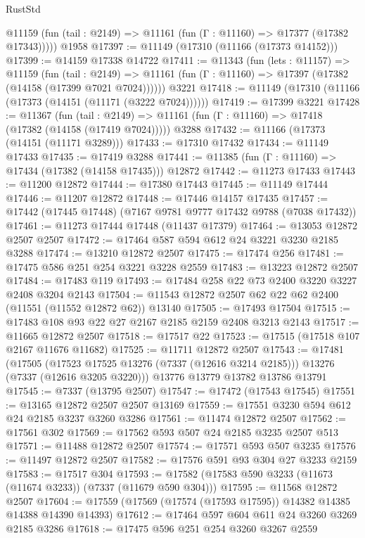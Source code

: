 \begin{lexlean}{RustStd}
\begin{coremodule}
      @11159 (fun (tail : @2149) => @11161 (fun (Γ : @11160) => @17377 (@17382 @17343)))))
    @1958
@17397 := @11149 (@17310 (@11166 (@17373 @14152)))
@17399 := @14159 @17338 @14722
@17411 := @11343
    (fun (lets : @11157) =>
    @11159
      (fun (tail : @2149) =>
      @11161 (fun (Γ : @11160) => @17397 (@17382 (@14158 (@17399 @7021 @7024))))))
    @3221
@17418 := @11149 (@17310 (@11166 (@17373 (@14151 (@11171 (@3222 @7024))))))
@17419 := @17399 @3221
@17428 := @11367
    (fun (tail : @2149) => @11161 (fun (Γ : @11160) => @17418 (@17382 (@14158 (@17419 @7024)))))
    @3288
@17432 := @11166 (@17373 (@14151 (@11171 @3289)))
@17433 := @17310 @17432
@17434 := @11149 @17433
@17435 := @17419 @3288
@17441 := @11385 (fun (Γ : @11160) => @17434 (@17382 (@14158 @17435))) @12872
@17442 := @11273 @17433
@17443 := @11200 @12872
@17444 := @17380 @17443
@17445 := @11149 @17444
@17446 := @11207 @12872
@17448 := @17446 @14157 @17435
@17457 := @17442 (@17445 @17448) (@7167 @9781 @9777 @17432 @9788 (@7038 @17432))
@17461 := @11273 @17444 @17448 (@11437 @17379)
@17464 := @13053 @12872 @2507 @2507
@17472 := @17464 @587 @594 @612 @24 @3221 @3230 @2185 @3288
@17474 := @13210 @12872 @2507
@17475 := @17474 @256
@17481 := @17475 @586 @251 @254 @3221 @3228 @2559
@17483 := @13223 @12872 @2507
@17484 := @17483 @119
@17493 := @17484 @258 @22 @73 @2400 @3220 @3227 @2408 @3204 @2143
@17504 := @11543 @12872 @2507 @62 @22 @62 @2400 (@11551 (@11552 @12872 @62)) @13140
@17505 := @17493 @17504
@17515 := @17483 @108 @93 @22 @27 @2167 @2185 @2159 @2408 @3213 @2143
@17517 := @11665 @12872 @2507
@17518 := @17517 @22
@17523 := @17515 (@17518 @107 @2167 @11676 @11682)
@17525 := @11711 @12872 @2507
@17543 := @17481
    (@17505 (@17523 @17525 @13276 (@7337 (@12616 @3214 @2185))) @13276 (@7337 (@12616 @3205 @3220)))
    @13776
    @13779
    @13782
    @13786
    @13791
@17545 := @7337 (@13795 @2507)
@17547 := @17472 (@17543 @17545)
@17551 := @13165 @12872 @2507 @2507 @13169
@17559 := @17551 @3230 @594 @612 @24 @2185 @3237 @3260 @3286
@17561 := @11474 @12872 @2507
@17562 := @17561 @302
@17569 := @17562 @593 @507 @24 @2185 @3235 @2507 @513
@17571 := @11488 @12872 @2507
@17574 := @17571 @593 @507 @3235
@17576 := @11497 @12872 @2507
@17582 := @17576 @591 @93 @304 @27 @3233 @2159
@17583 := @17517 @304
@17593 := @17582 (@17583 @590 @3233 (@11673 (@11674 @3233)) (@7337 (@11679 @590 @304)))
@17595 := @11568 @12872 @2507
@17604 := @17559 (@17569 (@17574 (@17593 @17595)) @14382 @14385 @14388 @14390 @14393)
@17612 := @17464 @597 @604 @611 @24 @3260 @3269 @2185 @3286
@17618 := @17475 @596 @251 @254 @3260 @3267 @2559

\end{coremodule}
\end{lexlean}
